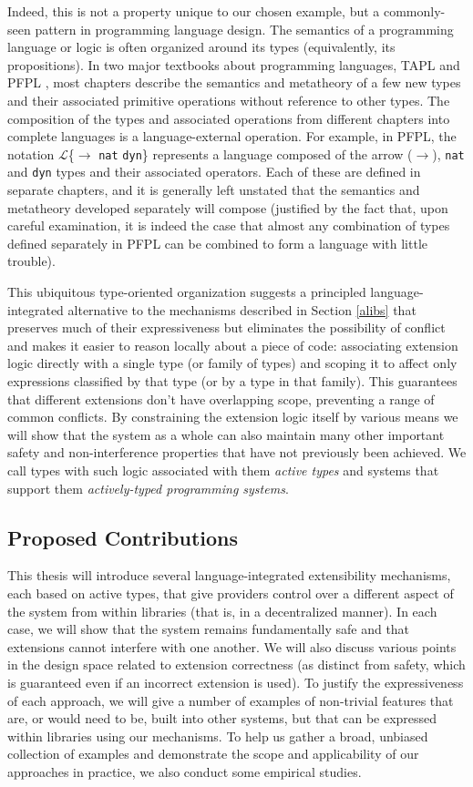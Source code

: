 Indeed, this is not a property unique to our chosen example, but a commonly-seen pattern in programming language design. The semantics of a programming language or logic is often organized around its types (equivalently, its propositions). In two major textbooks about programming languages, TAPL \cite{tapl} and PFPL \cite{pfpl}, most chapters describe the semantics and metatheory of a few new types and their associated primitive operations without reference to other types. The composition of the types and associated operations from different chapters into complete languages is a language-external operation. For example, in PFPL, the notation $\mathcal{L}$\{$\rightarrow$ \verb|nat| \verb|dyn|\} represents a language composed of the arrow ($\rightarrow$), \verb|nat| and \verb|dyn| types and their associated operators. Each of these are defined in separate chapters, and it is generally left unstated that the semantics and metatheory developed separately will compose (justified by the fact that, upon careful examination, it is indeed the case that almost any combination of types defined separately in PFPL can be combined to form a language with little trouble). 

This ubiquitous type-oriented organization suggests a principled language-integrated alternative to the mechanisms described in Section \ref{alibs} that preserves much of their expressiveness but eliminates the possibility of conflict and makes it easier to reason locally about a piece of code: associating extension logic directly with a single type (or family of types) and scoping it to affect only expressions classified by that type (or by a type in that family). This guarantees that different extensions don't have overlapping scope, preventing a range of common conflicts. By constraining the extension logic itself by various means we will show that the system as a whole can also maintain many other important safety and non-interference properties that have not previously been achieved. We call types with such logic associated with them \emph{active types} and systems that support them \emph{actively-typed programming systems}. 

\subsection{Proposed Contributions}
This thesis will introduce several language-integrated extensibility mechanisms, each based on active types, that give providers control over a different aspect of the system from within libraries (that is, in a decentralized manner). In each case, we will show that the system remains fundamentally safe and that extensions cannot interfere with one another. We will also discuss various points in the design space related to extension correctness (as distinct from safety, which is guaranteed even if an incorrect extension is used). To justify the  expressiveness of each approach, we will give a number of examples of non-trivial features that are, or would need to be, built into other systems, but that can be expressed within libraries using our mechanisms. To help us gather a broad, unbiased collection of examples and demonstrate the scope and applicability of our approaches in practice, we also conduct some empirical studies.

